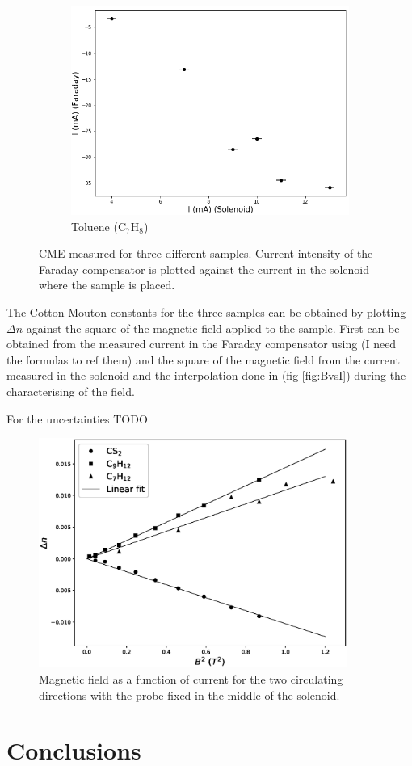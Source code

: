\documentclass[11pt,a4paper]{article}
\begin{document}
\begin{figure}[H]
\begin{subfigure}[b]{0.45\textwidth}
\includegraphics[width=\textwidth]{sample1}
\caption{Toluene (C$_7$H$_8$)}
\label{fig:CME_sample1}
\end{subfigure}
\caption{CME measured for three different samples. Current intensity of the Faraday compensator is plotted against the current in the solenoid where the sample is placed.}
\label{fig:CME}
\end{figure}

The Cotton-Mouton constants for the three samples can be obtained by plotting $\Delta n$ against the square of the magnetic field applied to the sample. First can be obtained from the measured current in the Faraday compensator using {\color{red}(I need the formulas to ref them)} and the square of the magnetic field from the current measured in the solenoid and the interpolation done in (fig \ref{fig:BvsI}) during the characterising of the field.

For the uncertainties {\color{red}TODO}

\begin{figure}[H]
\centering
\includegraphics[width=0.9\textwidth]{CM_consts.eps}
\caption{Magnetic field as a function of current for the two circulating directions with the probe fixed in the middle of the solenoid.}
\label{fig:CM_const}
\end{figure}

\section{Conclusions}

\newpage


\end{document}
